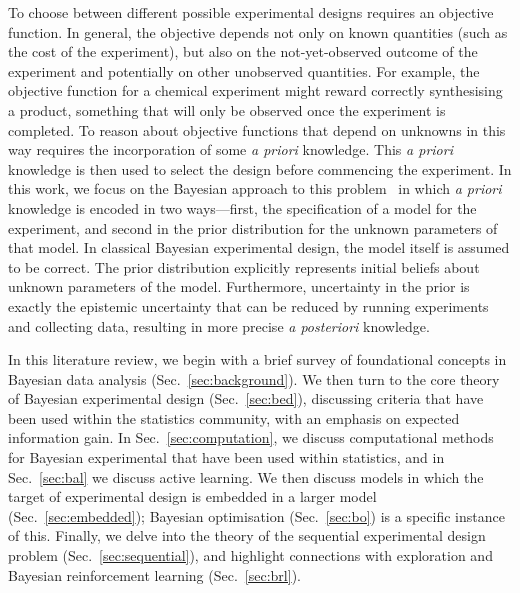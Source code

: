 \documentclass[a4paper, 10pt]{report}
\theoremstyle{plain}
\begin{document}
	To choose between different possible experimental designs requires an objective function.
	In general, the objective depends not only on known quantities (such as the cost of the experiment), but also on the not-yet-observed outcome of the experiment and potentially on other unobserved quantities. %
	For example, the objective function for a chemical experiment might reward correctly synthesising a product, something that will only be observed once the experiment is completed.
	To reason about objective functions that depend on unknowns in this way requires the incorporation of some \emph{a priori} knowledge. This \emph{a priori} knowledge is then used to select the design before commencing the experiment.
	In this work, we focus on the Bayesian approach to this problem~\citep{lindley1956,lindley1972,chaloner1995,ryan2016review,foster2019variational} in which \emph{a priori} knowledge is encoded in two ways---first, the specification of a model for the experiment, and second in the prior distribution for the unknown parameters of that model.
	In classical Bayesian experimental design, the model itself is assumed to be correct.
	The prior distribution explicitly represents initial beliefs about unknown parameters of the model.
	Furthermore, uncertainty in the prior is exactly the epistemic uncertainty that can be reduced by running experiments and collecting data, resulting in more precise \emph{a posteriori} knowledge.
	
	In this literature review, we begin with a brief survey of foundational concepts in Bayesian data analysis (Sec.~\ref{sec:background}).
	We then turn to the core theory of Bayesian experimental design (Sec.~\ref{sec:bed}), discussing criteria that have been used within the statistics community, with an emphasis on expected information gain. In Sec.~\ref{sec:computation}, we discuss computational methods for Bayesian experimental that have been used within statistics, and in Sec.~\ref{sec:bal} we discuss active learning.
	We then discuss models in which the target of experimental design is embedded in a larger model (Sec.~\ref{sec:embedded}); Bayesian optimisation (Sec.~\ref{sec:bo}) is a specific instance of this.
	Finally, we delve into the theory of the sequential experimental design problem (Sec.~\ref{sec:sequential}), and highlight connections with exploration and Bayesian reinforcement learning (Sec.~\ref{sec:brl}).
	
\end{document}
